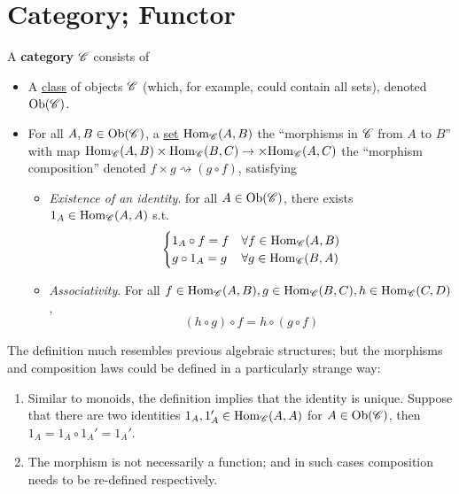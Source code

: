 \documentclass{article}
\begin{document}

\tableofcontents
\newpage

\section{Category; Functor}

\begin{definition}[Category]
    A \textbf{category} $\mathscr{C}$ consists of 
    \begin{itemize}
        \item A \underline{class} of objects $\mathscr{C}$ (which, for example, could contain all sets), denoted $\mathrm{Ob}(\mathscr{C})$.
        \item For all $A, B \in \mathrm{Ob}(\mathscr{C})$, a \underline{set} $\mathrm{Hom}_{\mathscr{C}}(A, B)$ the ``morphisms in $\mathscr{C}$ from $A$ to $B$'' with map $\mathrm{Hom}_{\mathscr{C}}(A, B) \times \mathrm{Hom}_{\mathscr{C}}(B, C) \to \times \mathrm{Hom}_{\mathscr{C}}(A, C)$ the ``morphism composition'' denoted $f \times g \rightsquigarrow (g\circ f)$, satisfying
        \begin{itemize}
            \item \emph{Existence of an identity}. for all $A \in \mathrm{Ob}(\mathscr{C})$, there exists $1_{A} \in \mathrm{Hom}_{\mathscr{C}}(A, A)$ s.t. 
            \[
            \begin{cases}
                1_{A} \circ f = f & \forall f \in \mathrm{Hom}_{\mathscr{C}}(A, B) \\
                g \circ 1_{A} = g & \forall g \in \mathrm{Hom}_{\mathscr{C}}(B, A)
            \end{cases}
            \]
            \item \emph{Associativity}. For all $f \in \mathrm{Hom}_{\mathscr{C}}(A, B), g\in \mathrm{Hom}_{\mathscr{C}}(B, C), h \in \mathrm{Hom}_{\mathscr{C}}(C, D)$, 
            \[
                (h \circ g) \circ f = h \circ (g \circ f)
            \]
        \end{itemize}
    \end{itemize}
\end{definition}

\begin{remark} The definition much resembles previous algebraic structures; but the morphisms and composition laws could be defined in a particularly strange way: 
    \begin{enumerate}
        \item Similar to monoids, the definition implies that the identity is unique. Suppose that there are two identities $1_{A}, 1_{A}' \in \mathrm{Hom}_{\mathscr{C}}(A, A)$ for $A \in \mathrm{Ob}(\mathscr{C})$, then $1_A = 1_A \circ 1_A' = 1_A'$.
        \item The morphism is not necessarily a function; and in such cases composition needs to be re-defined respectively.
    \end{enumerate}
\end{remark}
\end{document}
